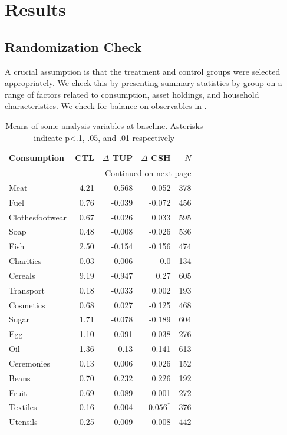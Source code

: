 \documentclass[12pt,article]{article}
\begin{document}
\section*{Results}
\label{sec-3}
\subsection*{Randomization Check}
\label{sec-3-1}

A crucial assumption is that the treatment and control groups were selected
appropriately. We check this by presenting summary statistics by group on a
range of factors related to consumption, asset holdings, and household
characteristics. We check for balance on observables in .

\begin{longtable}{lrrrrr}
\caption{\label{tab:balance_check}Means of some analysis variables at baseline.  Asterisks indicate p<.1, .05, and .01 respectively}
\\
\hline
Consumption & CTL & $\Delta$ TUP & $\Delta$ CSH & $N$\\
\hline
\endhead
\hline\multicolumn{5}{r}{Continued on next page} \\
\endfoot
\endlastfoot
Meat & 4.21 & -0.568 & -0.052 & 378\\
Fuel & 0.76 & -0.039 & -0.072 & 456\\
Clothesfootwear & 0.67 & -0.026 & 0.033 & 595\\
Soap & 0.48 & -0.008 & -0.026 & 536\\
Fish & 2.50 & -0.154 & -0.156 & 474\\
Charities & 0.03 & -0.006 & 0.0 & 134\\
Cereals & 9.19 & -0.947 & 0.27 & 605\\
Transport & 0.18 & -0.033 & 0.002 & 193\\
Cosmetics & 0.68 & 0.027 & -0.125 & 468\\
Sugar & 1.71 & -0.078 & -0.189 & 604\\
Egg & 1.10 & -0.091 & 0.038 & 276\\
Oil & 1.36 & -0.13 & -0.141 & 613\\
Ceremonies & 0.13 & 0.006 & 0.026 & 152\\
Beans & 0.70 & 0.232 & 0.226 & 192\\
Fruit & 0.69 & -0.089 & 0.001 & 272\\
Textiles & 0.16 & -0.004 & $0.056^{*}$ & 376\\
Utensils & 0.25 & -0.009 & 0.008 & 442\\

\end{longtable}
\end{document}
